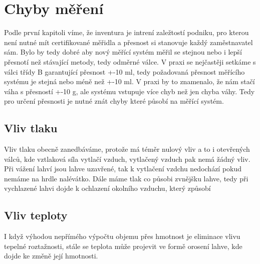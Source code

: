 

\section{Chyby měření}
Podle první kapitoli víme, že inventura je intrení zaležtostí podniku, pro kterou není nutné mít certifikované měřidla a přesnost si stanovuje každý zaměstnavatel sám. Bylo by tedy dobré aby nový měřící systém měřil se stejnou nebo i lepší přesnotí než stávající metody, tedy odměrné válce. V praxi se nejčastěji setkáme s válci třídy B garantující přesnost +-10 ml, tedy požadovaná přesnost měřícího systému je stejná nebo méně než +-10 ml. V praxi by to znamenalo, že nám stačí váha s přesností +-10 g, ale systému vstupuje více chyb než jen chyba váhy.
Tedy pro určení přesnosti je nutné znát chyby které působí na měřící systém.
\subsection{Vliv tlaku}
Vliv tlaku obecně zanedbáváme, protože má téměr nulový vliv a to i otevřených válců, kde vztlaková síla vytlačí vzduch, vytlačený vzduch pak nemá žádný vliv. Při vážení lahví jsou lahve uzavřené, tak k vytlačení vzdchu nedochází pokud nemáme na hrdle nalévátko. Dále máme tlak co působi zvnějšku lahve, tedy při vychlazené lahvi dojde k ochlazení okolního vzduchu, který způsobí 

\subsection{Vliv teploty}
\label{orosení}
I když výhodou nepřímého výpočtu objemu přes hmotnost je eliminace vlivu tepelné roztažnosti, stále se teplota může projevit ve formě orosení lahve, kde dojde ke změně její hmotnosti.

